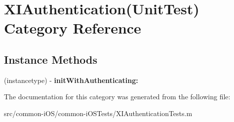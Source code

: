 \hypertarget{category_x_i_authentication_07_unit_test_08}{}\section{X\+I\+Authentication(Unit\+Test) Category Reference}
\label{category_x_i_authentication_07_unit_test_08}
\subsection*{Instance Methods}
\begin{DoxyCompactItemize}
\item 
\hypertarget{category_x_i_authentication_07_unit_test_08_a8e1240788a5578c470938fc5864949ec}{}\label{category_x_i_authentication_07_unit_test_08_a8e1240788a5578c470938fc5864949ec} 
(instancetype) -\/ {\bfseries init\+With\+Authenticating\+:}
\end{DoxyCompactItemize}


The documentation for this category was generated from the following file\+:\begin{DoxyCompactItemize}
\item 
src/common-\/i\+O\+S/common-\/i\+O\+S\+Tests/X\+I\+Authentication\+Tests.\+m\end{DoxyCompactItemize}

